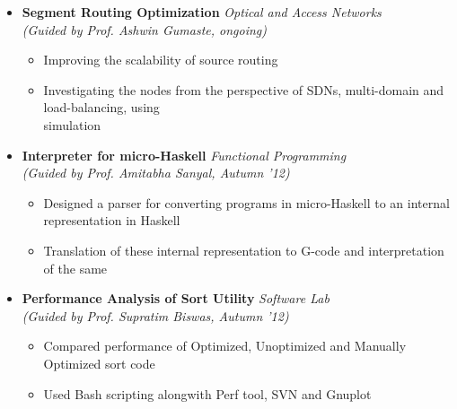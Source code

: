 \begin{itemize}
	\item \textbf{Segment Routing Optimization} \hfill \emph{Optical and Access Networks} \\
	\emph{(Guided by Prof. Ashwin Gumaste, ongoing)} \hfill \\[-0.6cm]
	\begin{itemize}
	      \item Improving the scalability of source routing \\[-0.5cm]
	      \item Investigating the nodes from the perspective of SDNs, multi-domain and load-balancing, using \\ simulation \\[-0.6cm]
	\end{itemize}

	\item \textbf{Interpreter for micro-Haskell} \hfill \emph{Functional Programming} \\
	\emph{(Guided by Prof. Amitabha Sanyal, Autumn '12)} \hfill \\[-0.6cm]
	\begin{itemize}
	      \item Designed a parser for converting programs in micro-Haskell to an internal representation in Haskell \\[-0.5cm]
	      \item Translation of these internal representation to G-code and interpretation of the same \\[-0.6cm]
	\end{itemize}

	\item \textbf{Performance Analysis of Sort Utility} \hfill \emph{Software Lab} \\
	\emph{(Guided by Prof. Supratim Biswas, Autumn '12)} \hfill \\[-0.6cm]
	\begin{itemize}
	      \item Compared performance of Optimized, Unoptimized and Manually Optimized sort code \\[-0.5cm]
	      \item Used Bash scripting alongwith Perf tool, SVN and Gnuplot \\[-0.6cm]
	\end{itemize}


\end{itemize}

